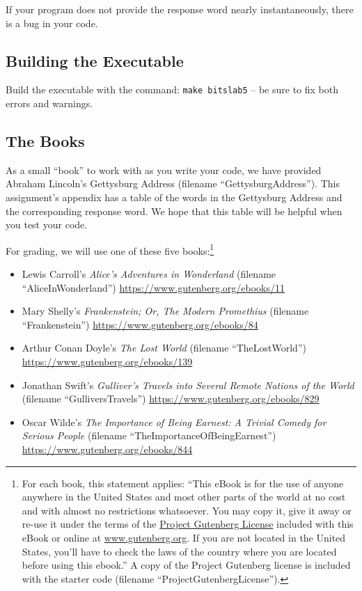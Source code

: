 If your program does not provide the response word nearly instantaneously,
there is a bug in your code.

\subsection*{Building the Executable}

Build the executable with the command: \texttt{make bitslab5} -- be sure to fix
both errors and warnings.

\subsection*{The Books}

As a small ``book'' to work with as you write your code, we have provided
Abraham Lincoln's Gettysburg Address (filename ``GettysburgAddress''). This
assignment's appendix has a table of the words in the Gettysburg Address and
the corresponding response word. We hope that this table will be helpful when
you test your code.

For grading, we will use one of these five books:\footnote{For each book, this
statement applies: ``This eBook is for the use of anyone anywhere in the United
States and most other parts of the world at no cost and with almost no
restrictions whatsoever. You may copy it, give it away or re-use it under the
terms of the \href{http://www.gutenberg.org/policy/license}{Project Gutenberg
License} included with this eBook or online at \url{www.gutenberg.org}. If you
are not located in the United States, you'll have to check the laws of the
country where you are located before using this ebook.'' A copy of the Project
Gutenberg license is included with the starter code (filename
``ProjectGutenbergLicense'').}
\begin{itemize}
\item Lewis Carroll's \textit{Alice's Adventures in Wonderland} (filename
    ``AliceInWonderland'') \url{https://www.gutenberg.org/ebooks/11}
\item Mary Shelly's \textit{Frankenstein; Or, The Modern Promethius} (filename
    ``Frankenstein'') \url{https://www.gutenberg.org/ebooks/84}
\item Arthur Conan Doyle's \textit{The Lost World} (filename ``TheLostWorld'')
    \url{https://www.gutenberg.org/ebooks/139}
\item Jonathan Swift's \textit{Gulliver's Travels into Several Remote Nations
    of the World} (filename ``GulliversTravels'')
    \url{https://www.gutenberg.org/ebooks/829}
\item Oscar Wilde's \textit{The Importance of Being Earnest: A Trivial Comedy
    for Serious People} (filename ``TheImportanceOfBeingEarnest'')
    \url{https://www.gutenberg.org/ebooks/844}
\end{itemize}

